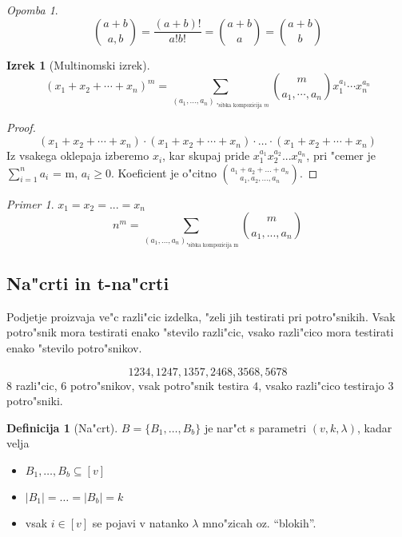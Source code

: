 \documentclass[a4paper,12pt]{article}
\theoremstyle{definition}
\newtheorem{defn}[counter]{Definicija}
\newtheorem{theorem}[counter]{Izrek}
\theoremstyle{remark}
\newtheorem*{ex}{Primer}
\newtheorem*{rem}{Opomba}
\begin{document}
\begin{rem}
	\[\binom{a+b}{a, b} = \frac{(a+b)!}{a!b!} = \binom{a+b}{a} = \binom{a+b}{b}\]
\end{rem}

\begin{theorem}[Multinomski izrek]
	\[(x_1 + x_2 + \cdots + x_n)^m = \sum_{(a_1, \ldots, a_n)_{\text{ "sibka kompozicija }m}} \binom{m}{a_1, \cdots, a_n} x_1^{a_1}\cdots x_n^{a_n}\]
\end{theorem}

\begin{proof}
	\[(x_1 + x_2 + \cdots + x_n)\cdot(x_1 + x_2 + \cdots + x_n)\cdot\ldots\cdot(x_1 + x_2 + \cdots + x_n)\]
	Iz vsakega oklepaja izberemo $x_i$, kar skupaj pride $x_1^{a_1} x_2^{a_2}...x_n^{a_n}$, pri "cemer je $\displaystyle \sum_{i = 1}^n a_i$ = m, $a_i \geqslant 0$. Koeficient je o"citno $\binom{a_1 + a_2 + ... + a_n}{a_1, a_2, ..., a_n}$.
\end{proof}

\begin{ex}
	$x_1 = x_2 = ... = x_n$
	\[n^m = \sum_{(a_1, ..., a_n)_{\text{"sibka kompozicija m}}} \binom{m}{a_1, ..., a_n}\]
\end{ex}


\subsection{Na"crti in t-na"crti}
Podjetje proizvaja ve"c razli"cic izdelka, "zeli jih testirati pri potro"snikih. Vsak potro"snik mora testirati enako "stevilo razli"cic, vsako razli"cico mora testirati enako "stevilo potro"snikov.

\[1234, 1247, 1357, 2468, 3568, 5678\]
$8$ razli"cic, $6$ potro"snikov, vsak potro"snik testira $4$, vsako razli"cico testirajo $3$ potro"sniki.

\begin{defn}[Na"crt]
	$B = \{B_1, \ldots, B_b\}$ je nar"ct s parametri $(v, k, \lambda)$, kadar velja
	\begin{itemize}
		\item $B_1, \ldots, B_b \subseteq [v]$
		\item $|B_1| = \ldots = |B_b| = k$
		\item vsak $i \in [v]$ se pojavi v natanko $\lambda$ mno"zicah oz. ``blokih''.
	\end{itemize} 
\end{defn}
\end{document}
